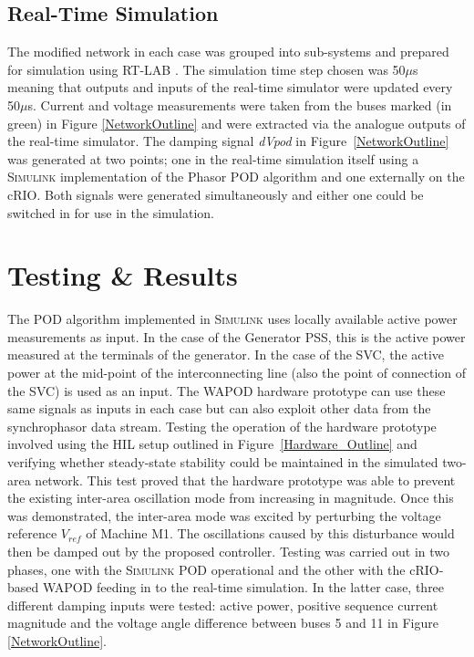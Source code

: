 \documentclass{ieeeaccess}
\begin{document}
\subsection{Real-Time Simulation}
The modified network in each case was grouped into sub-systems and prepared for simulation using RT-LAB \cite{eMEGASIM}. The simulation time step chosen was 50$\mu$s meaning that outputs and inputs of the real-time simulator were updated every 50$\mu$s. Current and voltage measurements were taken from the buses marked (in green) in Figure \ref{NetworkOutline} and were extracted via the analogue outputs of the real-time simulator. The damping signal \emph{dVpod} in Figure~\ref{NetworkOutline} was generated at two points; one in the real-time simulation itself using a \textsc{Simulink} implementation of the Phasor POD algorithm and one externally on the cRIO. Both signals were generated simultaneously and either one could be switched in for use in the simulation.

\section{Testing \& Results}\label{Results}
The POD algorithm implemented in \textsc{Simulink} uses locally available active power measurements as input. In the case of the Generator PSS, this is the active power measured at the terminals of the generator. In the case of the SVC, the active power at the mid-point of the interconnecting line (also the point of connection of the SVC) is used as an input. The WAPOD hardware prototype can use these same signals as inputs in each case but can also exploit other data from the synchrophasor data stream. Testing the operation of the hardware prototype involved using the HIL setup outlined in Figure~\ref{Hardware_Outline} and verifying whether steady-state stability could be maintained in the simulated two-area network. This test proved that the hardware prototype was able to prevent the existing inter-area oscillation mode from increasing in magnitude. Once this was demonstrated, the inter-area mode was excited by perturbing the voltage reference $V_{ref}$ of Machine M1. The oscillations caused by this disturbance would then be damped out by the proposed controller. Testing was carried out in two phases, one with the \textsc{Simulink} POD operational and the other with the cRIO-based WAPOD feeding in to the real-time simulation. In the latter case, three different damping inputs were tested: active power, positive sequence current magnitude and the voltage angle difference between buses 5 and 11 in Figure \ref{NetworkOutline}.
\end{document}
